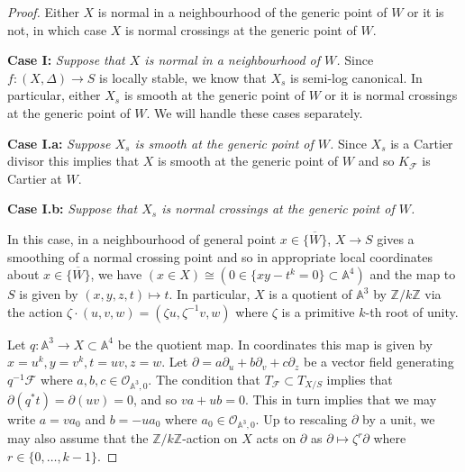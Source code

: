 \documentclass[12pt, a4paper]{amsart}
\DeclareMathOperator{\sing}{Sing}
\newcounter{Theorem}
\theoremstyle{definition}
\theoremstyle{named}
\begin{document}
\begin{proof}
Either $X$ is normal in a neighbourhood of the generic point of $W$ or it is not, in which case 
$X$ is normal crossings at the generic point of $W$.

{\bf Case I: }{\it Suppose that $X$ is normal 
in a neighbourhood of $W$.}
Since $f\colon (X, \Delta) \rightarrow S$ is locally stable, we know that $X_s$ is semi-log canonical.  In particular, either 
$X_s$ is smooth at the generic point of $W$ or it is normal crossings at the generic point of $W$.  We will handle these cases separately.

{\bf Case I.a: }{\it  Suppose $X_s$ is smooth at the generic point of $W$.}
Since $X_s$ is a Cartier divisor this implies that $X$ is smooth at the generic point of $W$
and so $K_{\mathcal F}$ is Cartier at $W$.

{\bf Case I.b: }{\it  Suppose that $X_s$ is normal crossings 
at the generic point of $W$.}

In this case, in a neighbourhood of general point  $x \in \overline{\{W\}}$, $X \rightarrow S$ gives a smoothing
of a normal crossing point and so in appropriate local coordinates about $x \in \overline{\{W\}}$,
we have $(x \in X) \cong (0 \in   \{xy - t^k = 0\} \subset \mathbb A^4)$
and the map to $S$ is given by $(x, y, z, t) \mapsto t$.
In particular, $X$ is a quotient of $\mathbb A^3$
by $\mathbb Z/k\mathbb Z$ via the action 
$\zeta \cdot (u, v, w) = (\zeta u, \zeta^{-1}v, w)$
where $\zeta$ is a primitive $k$-th root of unity.

Let $q\colon \mathbb A^3 \rightarrow X \subset \mathbb A^4$ be the quotient map. In coordinates this map
is given by $x = u^k, y = v^k, t = uv, z = w$.
Let $\partial = a\partial_u+b\partial_v+c\partial_z$ be a vector field generating $q^{-1}\mathcal F$ where $a, b, c \in \mathcal O_{\mathbb A^3, 0}$.
The condition that $T_{\mathcal F} \subset T_{X/S}$
implies that $\partial(q^*t) = \partial(uv) = 0$, and
so $va+ub = 0$.  This in turn implies that we may write
$a = va_0$ and $b = -ua_0$ where $a_0 \in \mathcal O_{\mathbb A^3, 0}$.
Up to rescaling $\partial$ by a unit, we may also assume that the $\mathbb Z/k\mathbb Z$-action
on $X$ acts on $\partial$ as $\partial \mapsto \zeta^r \partial$
where $r \in \{0, \dots, k-1\}$.  


\end{proof}
\end{document}
